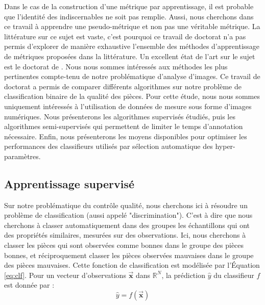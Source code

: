 Dans le cas de la construction d'une métrique par apprentissage, il est probable que l'identité des indiscernables ne soit pas remplie.
Aussi, nous cherchons dans ce travail à apprendre une pseudo-métrique et non pas une véritable métrique.
La littérature sur ce sujet est vaste, c'est pourquoi ce travail de doctorat n'a pas permis d'explorer de manière exhaustive l'ensemble des méthodes d'apprentissage de métriques proposées dans la littérature.
Un excellent état de l'art sur le sujet est le doctorat de \citeauthor{bellet_supervised_2012} \cite{bellet_supervised_2012}.
Nous nous sommes intéressés aux méthodes les plus pertinentes compte-tenu de notre problématique d'analyse d'images.
Ce travail de doctorat a permis de comparer différents algorithmes sur notre problème de classification binaire de la qualité des pièces.
Pour cette étude, nous nous sommes uniquement intéressés à l'utilisation de données de mesure sous forme d'images numériques.
Nous présenterons les algorithmes supervisés étudiés, puis les algorithmes semi-supervisés qui permettent de limiter le temps d'annotation nécessaire.
Enfin, nous présenterons les moyens disponibles pour optimiser les performances des classifieurs utilisés par sélection automatique des hyper-paramètres.

\subsection{Apprentissage supervisé}
Sur notre problématique du contrôle qualité, nous cherchons ici à résoudre un problème de classification (aussi appelé "discrimination").
C'est à dire que nous cherchons à classer automatiquement dans des groupes les échantillons qui ont des propriétés similaires, mesurées sur des observations.
Ici, nous cherchons à classer les pièces qui sont observées comme bonnes dans le groupe des pièces bonnes, et réciproquement classer les pièces observées mauvaises dans le groupe des pièces mauvaises.
Cette fonction de classification est modélisée par l'Équation \ref{eq:clf}.
Pour un vecteur d'observations $\vec{\mathbf{x}}$ dans $\mathbb {R}^{N}$, la prédiction $\hat{y}$ du classifieur $f$ est donnée par :
\begin{equation} \label{eq:clf}
\hat{y} = f\left(\vec{\mathbf{x}}\right)
\end{equation}

